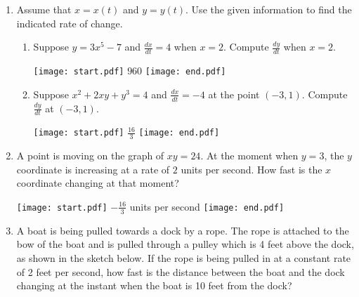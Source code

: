 \documentclass[12pt]{article}
\begin{document}
\begin{enumerate}

\item Assume that $x=x(t)$ and $y=y(t)$.  Use the given information to find the indicated rate of change.

\begin{enumerate}

\item Suppose $y=3x^5-7$ and $\frac{dx}{dt}=4$ when $x=2$.  Compute $\frac{dy}{dt}$ when $x=2$.

\texttt{[image: start.pdf]}
{{$960$}}
\texttt{[image: end.pdf]}


\item Suppose $x^2+2xy+y^3=4$ and $\frac{dx}{dt}=-4$ at the point $(-3,1)$.  Compute $\frac{dy}{dt}$ at $(-3,1)$.

\texttt{[image: start.pdf]}
{{$\frac{16}{3}$}}
\texttt{[image: end.pdf]}


\end{enumerate}

\item A point is moving on the graph of $xy=24$.  At the moment when $y=3$, the $y$ coordinate is increasing at a rate of $2$ units per second.  How fast is the $x$ coordinate changing at that moment?

\texttt{[image: start.pdf]}
{{$-\frac{16}{3}$ units per second}}
\texttt{[image: end.pdf]}


\item A boat is being pulled towards a dock by a rope.  The rope is attached to the bow of the boat and is pulled through a pulley which is 4 feet above the dock, as shown in the sketch below.  If the rope is being pulled in at a constant rate of 2 feet per second, how fast is the distance between the boat and the dock changing at the instant when the boat is 10 feet from the dock?


\end{enumerate}
\end{document}
